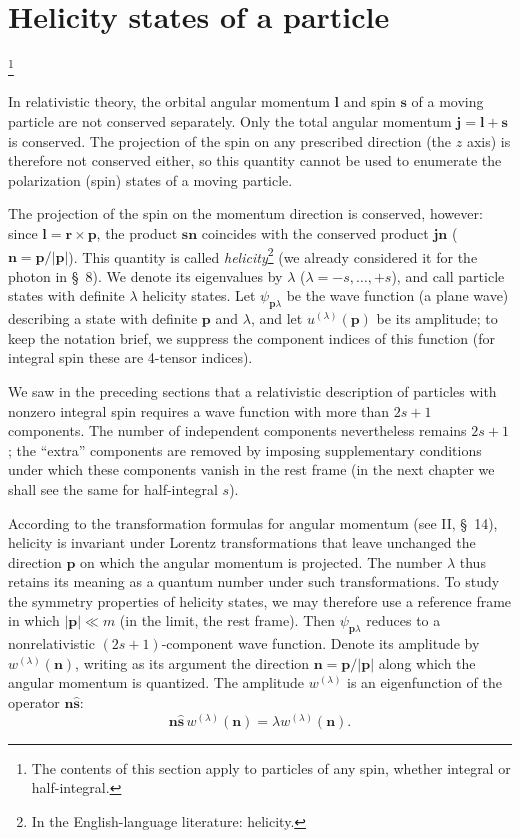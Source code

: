 
\section{Helicity states of a particle}
\footnote{The contents of this section apply to particles of any spin, whether integral or half-integral.}

In relativistic theory, the orbital angular momentum $\mathbf l$ and spin $\mathbf s$ of a moving particle are not conserved separately. Only the total angular momentum $\mathbf j=\mathbf l+\mathbf s$ is conserved. The projection of the spin on any prescribed direction (the $z$ axis) is therefore not conserved either, so this quantity cannot be used to enumerate the polarization (spin) states of a moving particle.

The projection of the spin on the momentum direction is conserved, however: since $\mathbf l=\mathbf r\times\mathbf p$, the product $\mathbf s\mathbf n$ coincides with the conserved product $\mathbf j\mathbf n$ ($\mathbf n=\mathbf p/|\mathbf p|$). This quantity is called \emph{helicity}\footnote{In the English-language literature: helicity.} (we already considered it for the photon in \S~8). We denote its eigenvalues by $\lambda$ ($\lambda=-s,\ldots,+s$), and call particle states with definite $\lambda$ helicity states. Let $\psi_{\mathbf p\lambda}$ be the wave function (a plane wave) describing a state with definite $\mathbf p$ and $\lambda$, and let $u^{(\lambda)}(\mathbf p)$ be its amplitude; to keep the notation brief, we suppress the component indices of this function (for integral spin these are 4-tensor indices).

We saw in the preceding sections that a relativistic description of particles with nonzero integral spin requires a wave function with more than $2s+1$ components. The number of independent components nevertheless remains $2s+1$; the ``extra'' components are removed by imposing supplementary conditions under which these components vanish in the rest frame (in the next chapter we shall see the same for half-integral $s$).

According to the transformation formulas for angular momentum (see II, \S~14), helicity is invariant under Lorentz transformations that leave unchanged the direction $\mathbf p$ on which the angular momentum is projected. The number $\lambda$ thus retains its meaning as a quantum number under such transformations. To study the symmetry properties of helicity states, we may therefore use a reference frame in which $|\mathbf p|\ll m$ (in the limit, the rest frame). Then $\psi_{\mathbf p\lambda}$ reduces to a nonrelativistic $(2s+1)$-component wave function. Denote its amplitude by $w^{(\lambda)}(\mathbf n)$, writing as its argument the direction $\mathbf n=\mathbf p/|\mathbf p|$ along which the angular momentum is quantized. The amplitude $w^{(\lambda)}$ is an eigenfunction of the operator $\mathbf n\widehat{\mathbf s}$:
\begin{equation}
\mathbf n\widehat{\mathbf s}\,w^{(\lambda)}(\mathbf n)
=\lambda w^{(\lambda)}(\mathbf n).
\tag{16.1}
\end{equation}

